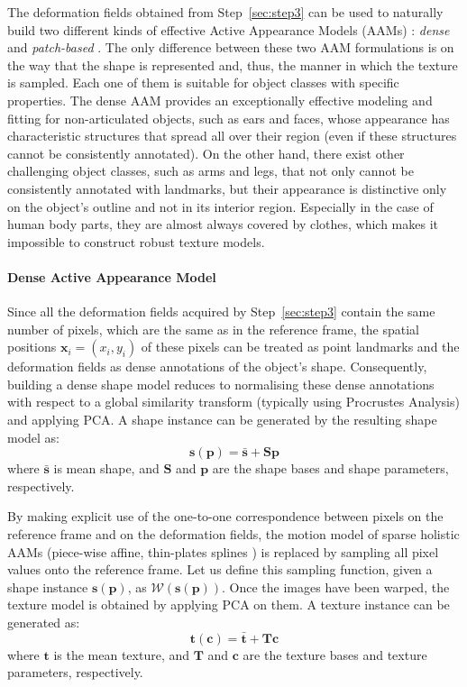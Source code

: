 The deformation fields obtained from Step~\ref{sec:step3} can be used to naturally build two different kinds of effective Active Appearance Models (AAMs) \cite{Cootes2001, Matthews2004}: \emph{dense} \cite{ramnath2008increasing, Amberg2009, anderson2014using} and \emph{patch-based} \cite{Tzimiropoulos2014}. The only difference between these two AAM formulations is on the way that the shape is represented and, thus, the manner in which the texture is sampled. Each one of them is suitable for object classes with specific properties. The dense AAM provides an exceptionally effective modeling and fitting for non-articulated objects, such as ears and faces, whose appearance has characteristic structures that spread all over their region (even if these structures cannot be consistently annotated). On the other hand, there exist other challenging object classes, such as arms and legs, that not only cannot be consistently annotated with landmarks, but their appearance is distinctive only on the object's outline and not in its interior region. Especially in the case of human body parts, they are almost always covered by clothes, which makes it impossible to construct robust texture models.

\paragraph{Dense Active Appearance Model} Since all the deformation fields acquired by Step~\ref{sec:step3} contain the same number of pixels, which are the same as in the reference frame, the spatial positions $\bm{x}_i=(x_i, y_i)$ of these pixels can be treated as point landmarks and the deformation fields as dense annotations of the object's shape. Consequently, building a dense shape model reduces to normalising these dense annotations with respect to a global similarity transform (typically using Procrustes Analysis) and applying PCA. A shape instance can be generated by the resulting shape model as:
\begin{equation}
    \bm{s}(\bm{p}) = \bm{\bar{s}} + \bm{S} \bm{p}
    \label{eq:shape_model}
\end{equation}
where $\bm{\bar{s}}$ is mean shape, and $\bm{S}$ and $\bm{p}$ are the shape bases and shape parameters, respectively.

By making explicit use of the one-to-one correspondence between pixels on the reference frame and on the deformation fields, the motion model of sparse holistic AAMs \cite{Cootes2001, Matthews2004} (piece-wise affine, thin-plates splines \cite{Bookstein1989}) is replaced by sampling all pixel values onto the reference frame. Let us define this sampling function, given a shape instance $\bm{s}(\bm{p})$, as $\mathcal{W}(\bm{s}(\bm{p}))$. Once the images have been warped, the texture model is obtained by applying PCA on them. A texture instance can be generated as:
\begin{equation}
    \bm{t}(\bm{c}) = \bm{\bar{t}} + \bm{T} \bm{c}
	\label{eq:tex_model}
\end{equation}
where $\bm{t}$ is the mean texture, and $\bm{T}$ and $\bm{c}$ are the texture bases and texture parameters, respectively.

